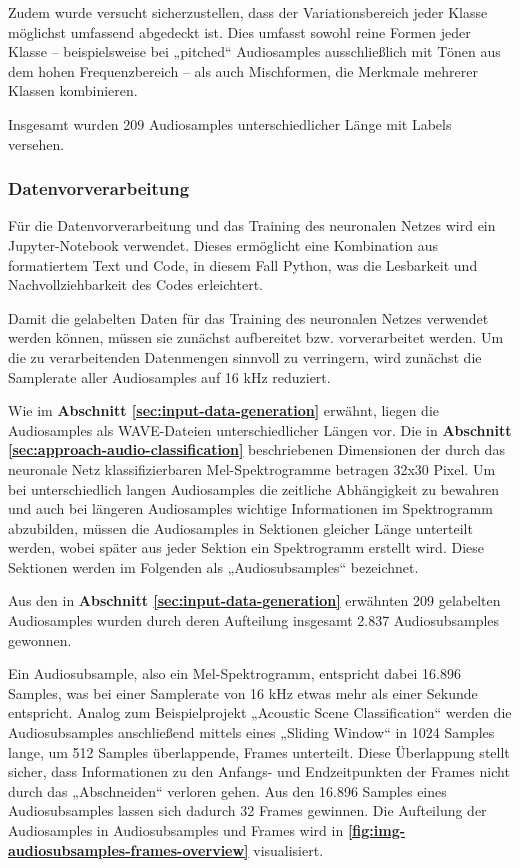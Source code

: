 Zudem wurde versucht sicherzustellen, dass der Variationsbereich jeder Klasse möglichst umfassend abgedeckt ist. Dies umfasst sowohl reine Formen jeder Klasse – beispielsweise bei „pitched“ Audiosamples ausschließlich mit Tönen aus dem hohen Frequenzbereich – als auch Mischformen, die Merkmale mehrerer Klassen kombinieren.

Insgesamt wurden 209 Audiosamples unterschiedlicher Länge mit Labels versehen.

\subsubsection{Datenvorverarbeitung}
\label{sec:data-preprocessing}

Für die Datenvorverarbeitung und das Training des neuronalen Netzes wird ein Jupyter-Notebook verwendet. Dieses ermöglicht eine Kombination aus formatiertem Text und Code, in diesem Fall Python, was die Lesbarkeit und Nachvollziehbarkeit des Codes erleichtert.

Damit die gelabelten Daten für das Training des neuronalen Netzes verwendet werden können, müssen sie zunächst aufbereitet bzw. vorverarbeitet werden. Um die zu verarbeitenden Datenmengen sinnvoll zu verringern, wird zunächst die Samplerate aller Audiosamples auf 16 kHz reduziert.

Wie im \textbf{Abschnitt \ref{sec:input-data-generation}} erwähnt, liegen die Audiosamples als WAVE-Dateien unterschiedlicher Längen vor. Die in \textbf{Abschnitt \ref{sec:approach-audio-classification}} beschriebenen Dimensionen der durch das neuronale Netz klassifizierbaren Mel-Spektrogramme betragen 32x30 Pixel. Um bei unterschiedlich langen Audiosamples die zeitliche Abhängigkeit zu bewahren und auch bei längeren Audiosamples wichtige Informationen im Spektrogramm abzubilden, müssen die Audiosamples in Sektionen gleicher Länge unterteilt werden, wobei später aus jeder Sektion ein Spektrogramm erstellt wird. Diese Sektionen werden im Folgenden als „Audiosubsamples“ bezeichnet.

Aus den in \textbf{Abschnitt \ref{sec:input-data-generation} }erwähnten 209 gelabelten Audiosamples wurden durch deren Aufteilung insgesamt 2.837 Audiosubsamples gewonnen.

Ein Audiosubsample, also ein Mel-Spektrogramm, entspricht dabei 16.896 Samples, was bei einer Samplerate von 16 kHz etwas mehr als einer Sekunde entspricht. Analog zum Beispielprojekt „Acoustic Scene Classification“ \cite{stm-asc}\cite{stm-asc-2} werden die Audiosubsamples anschließend mittels eines „Sliding Window“ in 1024 Samples lange, um 512 Samples überlappende, Frames unterteilt.  Diese Überlappung stellt sicher, dass Informationen zu den Anfangs- und Endzeitpunkten der Frames nicht durch das „Abschneiden“ verloren gehen. Aus den 16.896 Samples eines Audiosubsamples lassen sich dadurch 32 Frames gewinnen. Die Aufteilung der Audiosamples in Audiosubsamples und Frames wird in \textbf{\autoref{fig:img-audiosubsamples-frames-overview}} visualisiert.

